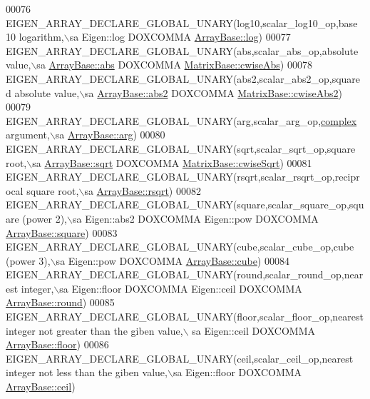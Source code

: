 \begin{DoxyCode}
00076   EIGEN\_ARRAY\_DECLARE\_GLOBAL\_UNARY(log10,scalar\_log10\_op,base 10 logarithm,\(\backslash\)sa Eigen::log DOXCOMMA 
      \hyperlink{group___core___module_a7748ba1f6891fa4e10723a8bf77b8770}{ArrayBase::log})
00077   EIGEN\_ARRAY\_DECLARE\_GLOBAL\_UNARY(abs,scalar\_abs\_op,absolute value,\(\backslash\)sa 
      \hyperlink{group___core___module_a5efe92eb15ea504206269a2a19b9878c}{ArrayBase::abs} DOXCOMMA \hyperlink{group___core___module_a8f2dbd5d9573c79c5dd356ddb29a0ee9}{MatrixBase::cwiseAbs})
00078   EIGEN\_ARRAY\_DECLARE\_GLOBAL\_UNARY(abs2,scalar\_abs2\_op,squared absolute value,\(\backslash\)sa 
      \hyperlink{group___core___module_ad213e9822777ff03219eed7063c26971}{ArrayBase::abs2} DOXCOMMA \hyperlink{group___core___module_a60808fcf09547e14952957bbdf75d3c6}{MatrixBase::cwiseAbs2})
00079   EIGEN\_ARRAY\_DECLARE\_GLOBAL\_UNARY(arg,scalar\_arg\_op,\hyperlink{structcomplex}{complex} argument,\(\backslash\)sa 
      \hyperlink{group___core___module_a38ad76c91fa4dcb1daae506098b30ae5}{ArrayBase::arg})
00080   EIGEN\_ARRAY\_DECLARE\_GLOBAL\_UNARY(sqrt,scalar\_sqrt\_op,square root,\(\backslash\)sa 
      \hyperlink{group___core___module_aef292634cdf57e09ee29c758deff8251}{ArrayBase::sqrt} DOXCOMMA \hyperlink{group___core___module_a8ceab546dd934174888bea8b7514ea47}{MatrixBase::cwiseSqrt})
00081   EIGEN\_ARRAY\_DECLARE\_GLOBAL\_UNARY(rsqrt,scalar\_rsqrt\_op,reciprocal square root,\(\backslash\)sa 
      \hyperlink{group___core___module_aa978767ac25c6d708d7ac41524f75252}{ArrayBase::rsqrt})
00082   EIGEN\_ARRAY\_DECLARE\_GLOBAL\_UNARY(square,scalar\_square\_op,square (power 2),\(\backslash\)sa Eigen::abs2 DOXCOMMA 
      Eigen::pow DOXCOMMA \hyperlink{group___core___module_a95c818b933d73944c53bf0226ea106c8}{ArrayBase::square})
00083   EIGEN\_ARRAY\_DECLARE\_GLOBAL\_UNARY(cube,scalar\_cube\_op,cube (power 3),\(\backslash\)sa Eigen::pow DOXCOMMA 
      \hyperlink{group___core___module_ab49fda99c455624b18410b9af0be71ec}{ArrayBase::cube})
00084   EIGEN\_ARRAY\_DECLARE\_GLOBAL\_UNARY(round,scalar\_round\_op,nearest integer,\(\backslash\)sa Eigen::floor DOXCOMMA 
      Eigen::ceil DOXCOMMA \hyperlink{group___core___module_a354b5032ab3852a015a55b4dbf257d3d}{ArrayBase::round})
00085   EIGEN\_ARRAY\_DECLARE\_GLOBAL\_UNARY(floor,scalar\_floor\_op,nearest integer not greater than the giben value,\(\backslash\)
      sa Eigen::ceil DOXCOMMA \hyperlink{group___core___module_a1dbd24e0b04ddd157436086266f917fd}{ArrayBase::floor})
00086   EIGEN\_ARRAY\_DECLARE\_GLOBAL\_UNARY(ceil,scalar\_ceil\_op,nearest integer not less than the giben value,\(\backslash\)sa 
      Eigen::floor DOXCOMMA \hyperlink{group___core___module_a644fa9e672def0cd2bdab1f4efe6400e}{ArrayBase::ceil})

\end{DoxyCode}
